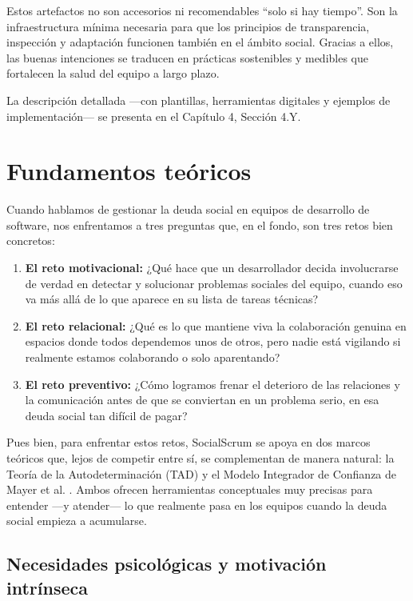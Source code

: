 Estos artefactos no son accesorios ni recomendables ``solo si hay tiempo''. Son la infraestructura mínima necesaria para que los principios de transparencia, inspección y adaptación funcionen también en el ámbito social.
Gracias a ellos, las buenas intenciones se traducen en prácticas sostenibles y medibles que fortalecen la salud del equipo a largo plazo.

La descripción detallada —con plantillas, herramientas digitales y ejemplos de implementación— se presenta en el Capítulo 4, Sección 4.Y.

\FloatBarrier

\section{Fundamentos teóricos}

Cuando hablamos de gestionar la deuda social en equipos de desarrollo de software, nos enfrentamos a tres preguntas que, en el fondo, son tres retos bien concretos:

\begin{enumerate}
    \item \textbf{El reto motivacional:} ¿Qué hace que un desarrollador decida involucrarse de verdad en detectar y solucionar problemas sociales del equipo, cuando eso va más allá de lo que aparece en su lista de tareas técnicas?
    \item \textbf{El reto relacional:} ¿Qué es lo que mantiene viva la colaboración genuina en espacios donde todos dependemos unos de otros, pero nadie está vigilando si realmente estamos colaborando o solo aparentando?
    \item \textbf{El reto preventivo:} ¿Cómo logramos frenar el deterioro de las relaciones y la comunicación antes de que se conviertan en un problema serio, en esa deuda social tan difícil de pagar?
\end{enumerate}

Pues bien, para enfrentar estos retos, SocialScrum se apoya en dos marcos teóricos que, lejos de competir entre sí, se complementan de manera natural: la Teoría de la Autodeterminación (TAD) \cite{ryan_self-determination_2000} y el Modelo Integrador de Confianza de Mayer et al. \cite{mayer_integrative_1995}. Ambos ofrecen herramientas conceptuales muy precisas para entender —y atender— lo que realmente pasa en los equipos cuando la deuda social empieza a acumularse.

\subsection{Necesidades psicológicas y motivación intrínseca}

